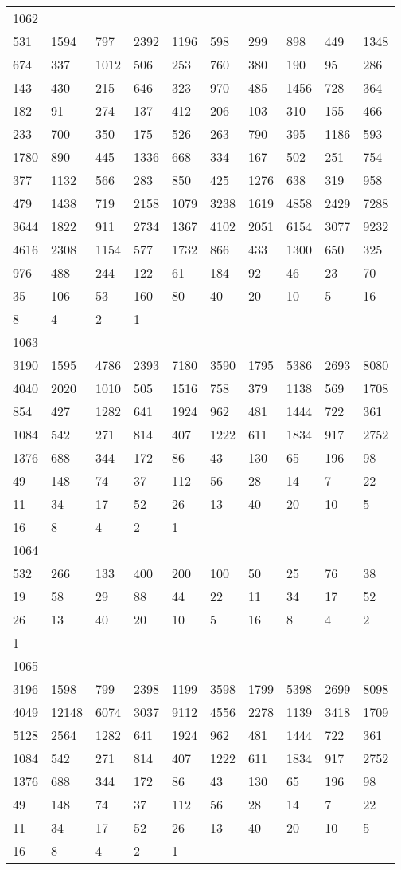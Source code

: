 \begin{longtable}{*{10}{l}}
1062&&&&&&&&&\\
531& 1594& 797& 2392& 1196& 598& 299& 898& 449& 1348\\
674& 337& 1012& 506& 253& 760& 380& 190& 95& 286\\
143& 430& 215& 646& 323& 970& 485& 1456& 728& 364\\
182& 91& 274& 137& 412& 206& 103& 310& 155& 466\\
233& 700& 350& 175& 526& 263& 790& 395& 1186& 593\\
1780& 890& 445& 1336& 668& 334& 167& 502& 251& 754\\
377& 1132& 566& 283& 850& 425& 1276& 638& 319& 958\\
479& 1438& 719& 2158& 1079& 3238& 1619& 4858& 2429& 7288\\
3644& 1822& 911& 2734& 1367& 4102& 2051& 6154& 3077& 9232\\
4616& 2308& 1154& 577& 1732& 866& 433& 1300& 650& 325\\
976& 488& 244& 122& 61& 184& 92& 46& 23& 70\\
35& 106& 53& 160& 80& 40& 20& 10& 5& 16\\
8& 4& 2& 1& \\

1063&&&&&&&&&\\
3190& 1595& 4786& 2393& 7180& 3590& 1795& 5386& 2693& 8080\\
4040& 2020& 1010& 505& 1516& 758& 379& 1138& 569& 1708\\
854& 427& 1282& 641& 1924& 962& 481& 1444& 722& 361\\
1084& 542& 271& 814& 407& 1222& 611& 1834& 917& 2752\\
1376& 688& 344& 172& 86& 43& 130& 65& 196& 98\\
49& 148& 74& 37& 112& 56& 28& 14& 7& 22\\
11& 34& 17& 52& 26& 13& 40& 20& 10& 5\\
16& 8& 4& 2& 1& \\

1064&&&&&&&&&\\
532& 266& 133& 400& 200& 100& 50& 25& 76& 38\\
19& 58& 29& 88& 44& 22& 11& 34& 17& 52\\
26& 13& 40& 20& 10& 5& 16& 8& 4& 2\\
1& \\

1065&&&&&&&&&\\
3196& 1598& 799& 2398& 1199& 3598& 1799& 5398& 2699& 8098\\
4049& 12148& 6074& 3037& 9112& 4556& 2278& 1139& 3418& 1709\\
5128& 2564& 1282& 641& 1924& 962& 481& 1444& 722& 361\\
1084& 542& 271& 814& 407& 1222& 611& 1834& 917& 2752\\
1376& 688& 344& 172& 86& 43& 130& 65& 196& 98\\
49& 148& 74& 37& 112& 56& 28& 14& 7& 22\\
11& 34& 17& 52& 26& 13& 40& 20& 10& 5\\
16& 8& 4& 2& 1& \\


\end{longtable}

